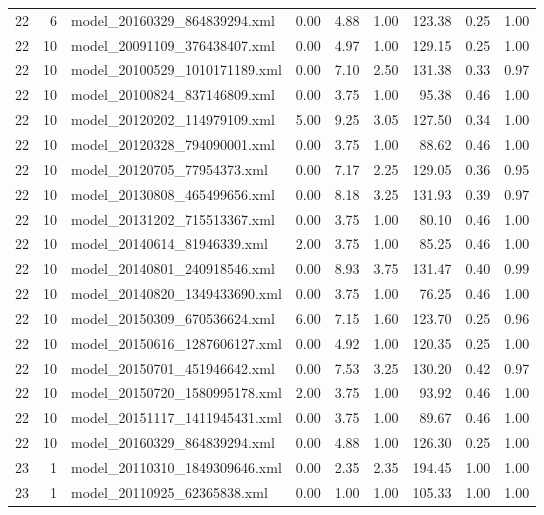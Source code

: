\begin{table}[ht]
\begin{tabular}{rrlrrrrrr}
   22 &   6 & model\_20160329\_864839294.xml & 0.00 & 4.88 & 1.00 & 123.38 & 0.25 & 1.00 \\ 
   22 &  10 & model\_20091109\_376438407.xml & 0.00 & 4.97 & 1.00 & 129.15 & 0.25 & 1.00 \\ 
   22 &  10 & model\_20100529\_1010171189.xml & 0.00 & 7.10 & 2.50 & 131.38 & 0.33 & 0.97 \\ 
   22 &  10 & model\_20100824\_837146809.xml & 0.00 & 3.75 & 1.00 & 95.38 & 0.46 & 1.00 \\ 
   22 &  10 & model\_20120202\_114979109.xml & 5.00 & 9.25 & 3.05 & 127.50 & 0.34 & 1.00 \\ 
   22 &  10 & model\_20120328\_794090001.xml & 0.00 & 3.75 & 1.00 & 88.62 & 0.46 & 1.00 \\ 
   22 &  10 & model\_20120705\_77954373.xml & 0.00 & 7.17 & 2.25 & 129.05 & 0.36 & 0.95 \\ 
   22 &  10 & model\_20130808\_465499656.xml & 0.00 & 8.18 & 3.25 & 131.93 & 0.39 & 0.97 \\ 
   22 &  10 & model\_20131202\_715513367.xml & 0.00 & 3.75 & 1.00 & 80.10 & 0.46 & 1.00 \\ 
   22 &  10 & model\_20140614\_81946339.xml & 2.00 & 3.75 & 1.00 & 85.25 & 0.46 & 1.00 \\ 
   22 &  10 & model\_20140801\_240918546.xml & 0.00 & 8.93 & 3.75 & 131.47 & 0.40 & 0.99 \\ 
   22 &  10 & model\_20140820\_1349433690.xml & 0.00 & 3.75 & 1.00 & 76.25 & 0.46 & 1.00 \\ 
   22 &  10 & model\_20150309\_670536624.xml & 6.00 & 7.15 & 1.60 & 123.70 & 0.25 & 0.96 \\ 
   22 &  10 & model\_20150616\_1287606127.xml & 0.00 & 4.92 & 1.00 & 120.35 & 0.25 & 1.00 \\ 
   22 &  10 & model\_20150701\_451946642.xml & 0.00 & 7.53 & 3.25 & 130.20 & 0.42 & 0.97 \\ 
   22 &  10 & model\_20150720\_1580995178.xml & 2.00 & 3.75 & 1.00 & 93.92 & 0.46 & 1.00 \\ 
   22 &  10 & model\_20151117\_1411945431.xml & 0.00 & 3.75 & 1.00 & 89.67 & 0.46 & 1.00 \\ 
   22 &  10 & model\_20160329\_864839294.xml & 0.00 & 4.88 & 1.00 & 126.30 & 0.25 & 1.00 \\ 
   23 &   1 & model\_20110310\_1849309646.xml & 0.00 & 2.35 & 2.35 & 194.45 & 1.00 & 1.00 \\ 
   23 &   1 & model\_20110925\_62365838.xml & 0.00 & 1.00 & 1.00 & 105.33 & 1.00 & 1.00 \\ 

\end{tabular}
\end{table}
